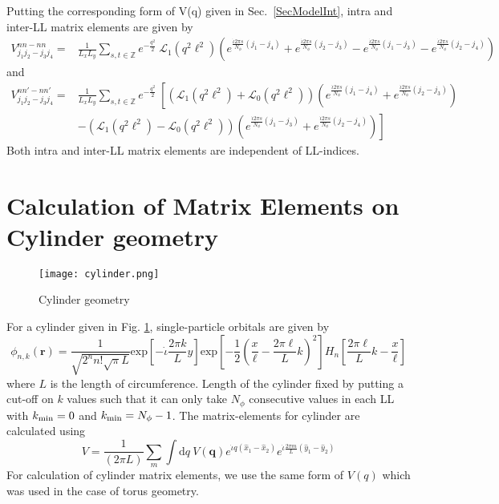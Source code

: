 \documentclass[prb,aps,epsfig,longbibliography,twocolumn]{revtex4-1}
\newcommand{\bsym}[1]{\boldsymbol{#1}}
\newcommand{\rbkt}[1]{\left( #1\right)}
\newcommand{\sbkt}[1]{\left[ #1\right]}
\newcommand{\np}{N_{\phi}}
\newcommand{\iiota}{\dot{\iota}}
\begin{document}
Putting the corresponding form of V(q) given in Sec.~\ref{SecModelInt}, intra and inter-LL matrix elements are given by
\begin{align}
V^{n n-n n}_{j_1 j_2-j_3 j_4} =&  \frac{1}{L_x L_y} \sum_{s,t\in \mathbb{Z}} e^{ -\frac{{q}^2}{2}}\ \mathcal{L}_1(q^2\ell^2) \rbkt{   {e^{\frac{{\iiota} 2\pi s}{\np} \rbkt{j_1 - j_4}} + e^{\frac{{\iiota} 2\pi s}{\np} \rbkt{j_2 - j_3}}}  -  { e^{\frac{{\iiota} 2\pi s}{\np} \rbkt{j_1 - j_3}} -  e^{\frac{{\iiota} 2\pi s}{\np} \rbkt{j_2 - j_4}}} }   
\end{align}
and 
\begin{align}
V^{n n'-n n'}_{j_1 j_2-j_3 j_4} =&  \frac{1}{L_x L_y} \sum_{s,t\in \mathbb{Z}} e^{ -\frac{{q}^2}{2}}\  \sbkt{   (\mathcal{L}_1(q^2\ell^2) + \mathcal{L}_0(q^2\ell^2)) \rbkt{e^{\frac{{\iiota} 2\pi s}{\np} \rbkt{j_1 - j_4}} + e^{\frac{{\iiota} 2\pi s}{\np} \rbkt{j_2 - j_3}}} \right. \nonumber\\
	& \left. -   (\mathcal{L}_1(q^2\ell^2) - \mathcal{L}_0(q^2\ell^2)) \rbkt{ e^{\frac{{\iiota} 2\pi s}{\np} \rbkt{j_1 - j_3}} +  e^{\frac{{\iiota} 2\pi s}{\np} \rbkt{j_2 - j_4}}} }   
\end{align}
Both intra and inter-LL matrix elements are independent of LL-indices.

\section{Calculation of Matrix Elements on Cylinder geometry}

\begin{figure}[h!]
	\centering
	\texttt{[image: cylinder.png]}
	\caption{Cylinder geometry}
	\label{cylinder}
\end{figure}

For a cylinder given in Fig. \ref{cylinder}, single-particle orbitals are given by
\begin{equation}\label{cylinderSPWF}
\phi_{n,k}(\bsym{r}) = \frac{1}{\sqrt{2^n n! \sqrt{\pi}L}}\text{exp}\sbkt{-{\iiota}\frac{2\pi k}{L}y}\text{exp}\sbkt{-\frac{1}{2}\rbkt{\frac{x}{\ell}-\frac{2\pi \ell}{L}k}^2}H_n\sbkt{\frac{2\pi \ell}{L}k -\frac{x}{\ell}}
\end{equation}
where $L$ is the length of circumference. Length of the cylinder fixed by putting a cut-off on $k$ values such that it can only take $\np$ consecutive values in each LL with $k_{\rm min}=0$ and $k_{\rm min}=\np-1$.
The matrix-elements for cylinder are calculated using
\begin{equation}\label{cyl_vhat}
{V} = \frac{1}{(2\pi L)}\sum_{m}\int \text{d}q\ V(\bsym{q}) e^{{\iiota} q (\hat{x}_1 - \hat{x}_2)} e^{{\iiota} \frac{2\pi m}{L} (\hat{y}_1 - \hat{y}_2)}
\end{equation}
For calculation of cylinder matrix elements, we use the same form of $V(q)$ which was used in the case of torus geometry.
\end{document}
